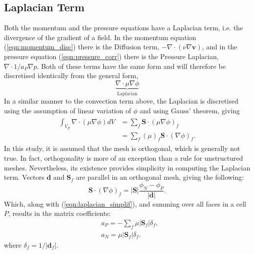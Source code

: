 \documentclass[final,3p,times,twocolumn]{elsarticle}
\begin{document}
\subsection{Laplacian Term}
Both the momentum and the pressure equations have a Laplacian term, i.e. the divergence of the gradient of a field. In the momentum equation (\ref{eqn:momentum_disc}) there is the Diffusion term, $- \nabla \cdot (\nu \nabla \mathbf{v})$, and in the pressure equation (\ref{eqn:pressure_corr}) there is the Pressure Laplacian, $\nabla \cdot 1/a_P \nabla p $. Both of these terms have the same form and will therefore be discretised identically from the general form, 
\begin{equation}
    \label{eqn:laplacian}
    \underbrace{\nabla \cdot \mu \nabla \phi}_\textrm{Laplacian}    
\end{equation}
In a similar manner to the convection term above, the Laplacian is discretised using the assumption of linear variation of $\phi$ and using Gauss' theorem, giving
\begin{align}
    \begin{split}
        \int_{V_P} \nabla \cdot (  \mu \nabla \phi  ) dV &= \sum\limits_f \mathbf{S} \cdot (  \mu \nabla \phi )_f
        \\
        &= \sum\limits_f (\mu)_f \mathbf{S} \cdot ( \nabla \phi )_f .
    \end{split}
    \label{eqn:laplacian_simplif}
\end{align}
In this study, it is assumed that the mesh is orthogonal, which is generally not true. In fact, orthogonality is more of an exception than a rule for unstructured meshes. Nevertheless, its existence provides simplicity in computing the Laplacian term. Vectors $\mathbf{d}$ and $\mathbf{S}_f$ are parallel in an orthogonal mesh, giving the following:
\begin{equation}
    \label{eqn:laplac_SgradPhi}
    \mathbf{S} \cdot (\nabla \phi)_f = |\mathbf{S}| \frac{\phi_N - \phi_P}{|\mathbf{d}|}.
\end{equation}
Which, along with (\ref{eqn:laplacian_simplif}), and summing over all faces in a cell $P$, results in the matrix coefficients:
\begin{align}
    \label{eqn:lapl_matrix}
    &a_P = - \sum\limits_f \mu |\mathbf{S}_f| \delta_f , \\
    &a_N = \mu |\mathbf{S}_f| \delta_f .
\end{align}
where $\delta_f = 1/|\mathbf{d}_f|$.
\end{document}
